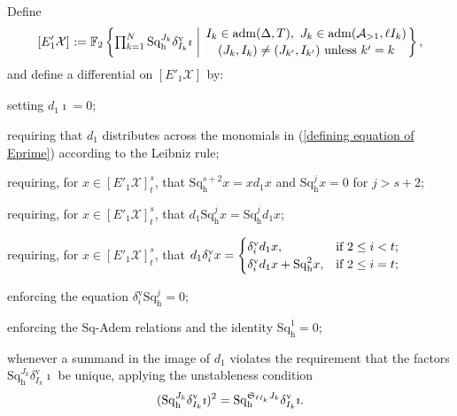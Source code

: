 \documentclass[11pt]{amsart} \renewcommand{\baselinestretch}{1.2}
\theoremstyle{plain}
\numberwithin{equation}{section} %
\theoremstyle{plain}
\numberwithin{equation}{chapter} %
\newcommand{\calA}{\mathcal{A}}
\newcommand{\calx}{\mathcal{X}}
\newcommand{\Sq}{\mathrm{Sq}}
\newcommand{\LieSteen}{\calA}
\newcommand{\aDTnoplus}{\mathrm{adm}(\Delta,T)}
\newcommand{\aS}[2][1]{\mathrm{adm}(\LieSteen_{>#1},#2)}
\newcommand{\F}{\mathbb{F}}
\newcommand{\Ftwo}{\F_2}
\newcommand{\STOP}{\mathfrak{S}}
\newcommand{\Eprime}[5]{[E'_{#2}#3]^{#4}_{#5}}
\newcommand{\uver}{^\mathrm{v}}
\newcommand{\dhor}{_\mathrm{h}}
\newcommand{\Sqh}{\mathrm{Sq}\dhor}
\newcommand{\deltav}{\delta\uver}
\begin{document}
\begin{Calculations of HWn}
Define
\begin{equation}\label{defining equation of Eprime}
\Eprime{blank}{1}{\calx}{}{}:=
\Ftwo\left\{\textstyle\prod_{k=1}^N\Sqh^{J_k}\deltav_{I_k}\imath\ \middle|\ 
\genfrac{}{}{0pt}{}{I_k\in \aDTnoplus,\ J_k\in \aS{\ell I_k}}{(J_k,I_k)\neq (J_{k'},I_{k'})\textup{ unless }k'=k}
\right\},
\end{equation}
and define a differential on $\Eprime{blank}{1}{\calx}{}{}$ by:
\setcounter{keepeqno}{\value{equation}}%
  \begin{list}{(\theequation)}{}%
  \setcounter{equation}{\value{keepeqno}}
  \setlength{\itemsep}{2pt}
  \setlength{\parskip}{0pt}
  \setlength{\parsep}{0pt}
\item \label{ITM1} setting $d_1\imath=0$;
\item \label{ITM2} requiring that $d_1$ distributes across the monomials in (\ref{defining equation of Eprime}) according to the Leibniz rule;
\item \label{ITM2.5} %
requiring, for $x\in \Eprime{blank}{1}{\calx}{s}{t}$, that $\Sqh^{s+2}x=xd_1x$ and $\Sqh^jx=0$ for $j>s+2$;
\item \label{ITM3} requiring, for $x\in \Eprime{blank}{1}{\calx}{s}{t}$, that $d_1\Sqh^jx = \Sqh^jd_1x$;
\item \label{ITM4}
requiring, for $x\in \Eprime{blank}{1}{\calx}{s}{t}$, that $d_1\deltav_ix=
\begin{cases}
\deltav_id_1x,&\textup{if $2\leq i < t$};\\
\deltav_id_1x + \Sqh^2 x,&\textup{if $2\leq i = t$};
\end{cases}$
\item \label{ITM5} enforcing the equation $\deltav_i\Sqh^j=0$;
\item \label{ITM6} enforcing the $\Sq$-Adem relations and the identity $\Sqh^1=0$;
\item \label{ITM7} 
whenever a summand in the image of $d_1$ violates the requirement that the factors $\Sqh^{J_k}\deltav_{I_k}\imath$ be unique, applying the unstableness condition
\[(\Sqh^{J_k}\deltav_{I_k}\imath)^{2}=\Sqh^{\smash{\STOP_{\ell I_k}J_k}}\deltav_{I_k}\imath.\]

\end{list}
\end{Calculations of HWn}
\end{document}
